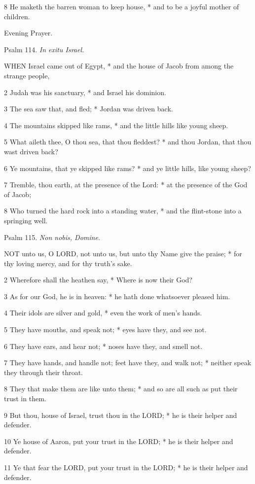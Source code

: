 8 He maketh the barren woman to keep house, * and to
be a joyful mother of children. 

Evening
Prayer.

Psalm
114. \emph{In exitu Israel.}

WHEN
Israel came out of Egypt, * and the house of Jacob from among the strange
people,

2 Judah was his sanctuary, * and Israel his dominion.

3 The sea saw that, and fled; * Jordan was driven back.

4 The mountains skipped like rams, * and the little
hills like young sheep.

5 What aileth thee, O thou sea, that thou fleddest?
* and thou Jordan, that thou wast driven back?

6 Ye mountains, that ye skipped like rams? * and ye
little hills, like young sheep?

7 Tremble, thou earth, at the presence of the Lord:
* at the presence of the God of Jacob;

8 Who turned the hard rock into a standing water, *
and the flint-stone into a springing well.

Psalm
115. \emph{Non nobis, Domine.}

NOT
unto us, O LORD, not unto us, but unto thy Name give the praise; * for
thy loving mercy, and for thy truth’s sake.

2 Wherefore shall the heathen say, * Where is now their
God?

3 As for our God, he is in heaven: * he hath done whatsoever
pleased him.

4 Their idols are silver and gold, * even the work
of men’s hands.

5 They have mouths, and speak not; * eyes have they,
and see not.

6 They have ears, and hear not; * noses have they,
and smell not.

7 They have hands, and handle not; feet have they,
and walk not; * neither speak they through their throat.

8 They that make them are like unto them; * and so
are all such as put their trust in them.

9 But thou, house of Israel, trust thou in the LORD;
* he is their helper and defender.

10 Ye house of Aaron, put your trust in the LORD; *
he is their helper and defender.

11 Ye that fear the LORD, put your trust in the LORD;
* he is their helper and defender.

